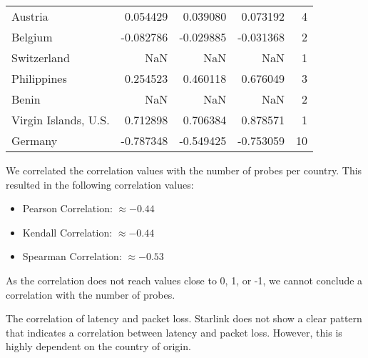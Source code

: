 \begin{table}[ht]
\begin{tabular}{lrrrr}
		Austria               & 0.054429    & 0.039080    & 0.073192    & 4         \\
		Belgium               & -0.082786   & -0.029885   & -0.031368   & 2         \\
		Switzerland           & NaN         & NaN         & NaN         & 1         \\
		Philippines           & 0.254523    & 0.460118    & 0.676049    & 3         \\
		Benin                 & NaN         & NaN         & NaN         & 2         \\
		Virgin Islands, U.S.  & 0.712898    & 0.706384    & 0.878571    & 1         \\
		Germany               & -0.787348   & -0.549425   & -0.753059   & 10        \\
		\bottomrule
	\end{tabular}
\end{table}

We correlated the correlation values with the number of probes per country.
This resulted in the following correlation values:

\begin{itemize}
	\item Pearson Correlation: $\approx -0.44$
	\item Kendall Correlation: $\approx -0.44$
	\item Spearman Correlation: $\approx -0.53$
\end{itemize}

As the correlation does not reach values close to 0, 1, or -1, we cannot
conclude a correlation with the number of probes.

\begin{takeaway}{The correlation of latency and packet loss.}
	Starlink does not show a clear pattern that indicates a correlation
	between latency and packet loss. However, this is highly dependent on
	the country of origin.
\end{takeaway}

